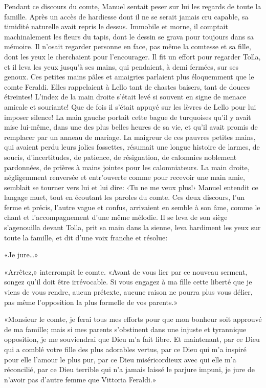 Pendant ce discours du comte, Manuel sentait peser sur lui les regards de toute la famille. Après un accès de hardiesse dont il ne se serait jamais cru capable, sa timidité naturelle avait repris le dessus. Immobile et morne, il comptait machinalement les fleurs du tapis, dont le dessin se grava pour toujours dans sa mémoire. Il n'osait regarder personne en face, pas même la comtesse et sa fille, dont les yeux le cherchaient pour l'encourager. Il fit un effort pour regarder Tolla, et il leva les yeux jusqu'à ses mains, qui pendaient, à demi fermées, sur ses genoux. Ces petites mains pâles et amaigries parlaient plus éloquemment que le comte Feraldi. Elles rappelaient à Lello tant de chastes baisers, tant de douces étreintes! L'index de la main droite s'était levé si souvent en signe de menace amicale et souriante! Que de fois il s'était appuyé sur les lèvres de Lello pour lui imposer silence! La main gauche portait cette bague de turquoises qu'il y avait mise lui-même, dans une des plus belles heures de sa vie, et qu'il avait promis de remplacer par un anneau de mariage. La maigreur de ces pauvres petites mains, qui avaient perdu leurs jolies fossettes, résumait une longue histoire de larmes, de soucis, d'incertitudes, de patience, de résignation, de calomnies noblement pardonnées, de prières à mains jointes pour les calomniateurs. La main droite, négligemment renversée et entr'ouverte comme pour recevoir une main amie, semblait se tourner vers lui et lui dire: ‹Tu ne me veux plus!› Manuel entendit ce langage muet, tout en écoutant les paroles du comte. Ces deux discours, l'un ferme et précis, l'autre vague et confus, arrivaient en semble à son âme, comme le chant et l'accompagnement d'une même mélodie. Il se leva de son siège s'agenouilla devant Tolla, prit sa main dans la sienne, leva hardiment les yeux sur toute la famille, et dit d'une voix franche et résolue:

«Je jure\ldots{}»

«Arrêtez,» interrompit le comte. «Avant de vous lier par ce nouveau serment, songez qu'il doit être irrévocable. Si vous engagez à ma fille cette liberté que je viens de vous rendre, aucun prétexte, aucune raison ne pourra plus vous délier, pas même l'opposition la plus formelle de vos parents.»

«Monsieur le comte, je ferai tous mes efforts pour que mon bonheur soit approuvé de ma famille; mais si mes parents s'obstinent dans une injuste et tyrannique opposition, je me souviendrai que Dieu m'a fait libre. Et maintenant, par ce Dieu qui a comblé votre fille des plus adorables vertus, par ce Dieu qui m'a inspiré pour elle l'amour le plus pur, par ce Dieu miséricordieux avec qui elle m'a réconcilié, par ce Dieu terrible qui n'a jamais laissé le parjure impuni, je jure de n'avoir pas d'autre femme que Vittoria Feraldi.»

